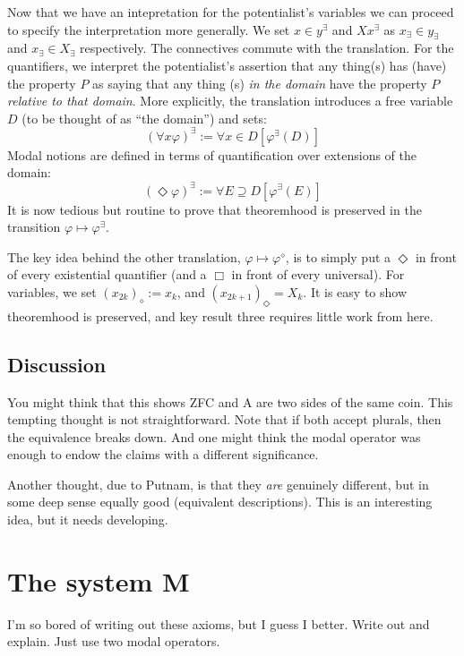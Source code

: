 \documentclass{article}
\begin{document}
Now that we have an intepretation for the potentialist's variables we can proceed to specify 
the interpretation more generally. We set $x \in y^\exists$ and $Xx^\exists$ as $x_\exists \in y_\exists$ 
and $x_\exists \in X_\exists$ respectively. The connectives commute with the translation. For the quantifiers,
we interpret the potentialist's assertion that any thing(s) has (have) the property $P$ as saying 
that any thing (s) \emph{in the domain} have the property $P$ \emph{relative to that domain}. More explicitly, 
the translation introduces a free variable $D$ (to be thought of as ``the domain'') and sets:
\[(\forall x \varphi)^\exists := \forall x \in D [\varphi^\exists(D)]\]
Modal notions are defined in terms of quantification over extensions of the domain:
\[ (\Diamond \varphi)^\exists := \forall E \supseteq D [\varphi^\exists(E)]\]
It is now tedious but routine to prove that theoremhood is preserved 
in the transition $\varphi \mapsto \varphi^\exists$.

The key idea behind the other translation, $\varphi \mapsto \varphi^\diamond$, 
is to simply put a $\Diamond$ in front of every existential quantifier (and a $\Box$ in front of 
every universal). For variables, we set $(x_{2k})_\diamond := x_k$, and $(x_{2k+1})_\Diamond = X_k$.
It is easy to show theoremhood is preserved, and key result three requires little work from here.

\subsection{Discussion}
You might think that this shows ZFC and A are two sides of the same coin. 
This tempting thought is not straightforward. 
Note that if both accept plurals, then the equivalence breaks down. 
And one might think the modal operator was enough to endow the claims with a different significance.

Another thought, due to Putnam, is that they \emph{are} genuinely different, but in 
some deep sense equally good (equivalent descriptions). This is an interesting idea, but 
it needs developing.
\section{The system M}
I'm so bored of writing out these axioms, but I guess I better. Write out 
and explain. Just use two modal operators. 
\end{document}
